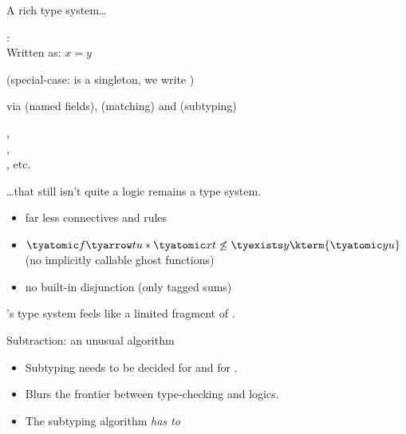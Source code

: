 \documentclass[final,xetex]{beamer}
\begin{document}
\begin{frame}{A rich type system\ldots}
  \begin{description}[\hspace{10.2em}]
    \item[Singleton types] :   
      \\ Written as: $x = y$
    \item[Constructor types] 
      (special-case:  is a singleton, we write
      )
    \item[Decomposition] via  (named fields),
       (matching) and  (subtyping)
    \item[Several possible types] ,\\
      ,
      \\, etc.
  \end{description}
\end{frame}

\begin{frame}{\ldots that still isn't quite a logic}
  \mezzo remains a type system.
  \begin{itemize}
    \item far less connectives and rules
    \item $\tyatomic f{\tyarrow tu} \ast \tyatomic xt \not\leq
      \tyexists y\kterm {\tyatomic yu}$ (no implicitly callable ghost functions)
    \item no built-in disjunction (only tagged sums)
  \end{itemize}

  \bigskip

  \mezzo's type system feels like a limited fragment of .
\end{frame}

\begin{frame}{Subtraction: an unusual algorithm}
  \begin{itemize}
    \item Subtyping needs to be decided for  and for
      .
    \item %
      Blurs the frontier between type-checking and logics.
    \item %
      The subtyping algorithm \emph{has to} %
  \end{itemize}
\end{frame}
\end{document}
